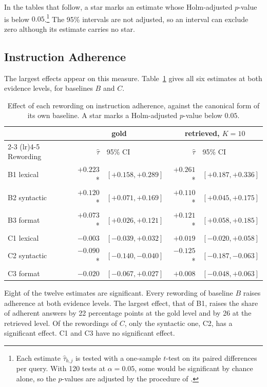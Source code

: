 \documentclass[12pt,a4paper,oneside]{scrreprt}
\begin{document}
In the tables that follow, a star marks an estimate whose Holm-adjusted $p$-value is below $0.05$.\footnote{Each estimate $\hat{\tau}_{b,j}$ is tested with a one-sample $t$-test on its paired differences per query. With 120 tests at $\alpha = 0.05$, some would be significant by chance alone, so the $p$-values are adjusted by the procedure of \citet{holm1979}.} The 95\% intervals are not adjusted, so an interval can exclude zero although its estimate carries no star. 
\subsection{Instruction Adherence}

The largest effects appear on this measure. Table~\ref{tab:adherence} gives all six estimates at both evidence levels, for baselines $B$ and $C$.
\begin{table}[htbp]
\centering
\caption{Effect of each rewording on instruction adherence, against the canonical form of its own baseline. A star marks a Holm-adjusted $p$-value below $0.05$.}
\label{tab:adherence}
\begin{tabular}{lrlrl}
\toprule
 & \multicolumn{2}{c}{gold} & \multicolumn{2}{c}{retrieved, $K = 10$} \\
\cmidrule(lr){2-3} \cmidrule(lr){4-5}
Rewording & $\hat{\tau}$ & 95\% CI & $\hat{\tau}$ & 95\% CI \\
\midrule
B1 lexical   & $+0.223$* & $[+0.158, +0.289]$ & $+0.261$* & $[+0.187, +0.336]$ \\
B2 syntactic & $+0.120$* & $[+0.071, +0.169]$ & $+0.110$* & $[+0.045, +0.175]$ \\
B3 format    & $+0.073$* & $[+0.026, +0.121]$ & $+0.121$* & $[+0.058, +0.185]$ \\
C1 lexical   & $-0.003$\phantom{*} & $[-0.039, +0.032]$ & $+0.019$\phantom{*} & $[-0.020, +0.058]$ \\
C2 syntactic & $-0.090$* & $[-0.140, -0.040]$ & $-0.125$* & $[-0.187, -0.063]$ \\
C3 format    & $-0.020$\phantom{*} & $[-0.067, +0.027]$ & $+0.008$\phantom{*} & $[-0.048, +0.063]$ \\
\bottomrule
\end{tabular}
\end{table}

Eight of the twelve estimates are significant. Every rewording of baseline $B$ raises adherence at both evidence levels. The largest effect, that of B1, raises the share of adherent answers by 22 percentage points at the gold level and by 26 at the retrieved level. Of the rewordings of $C$, only the syntactic one, C2, has a significant effect. C1 and C3 have no significant effect.
\end{document}
